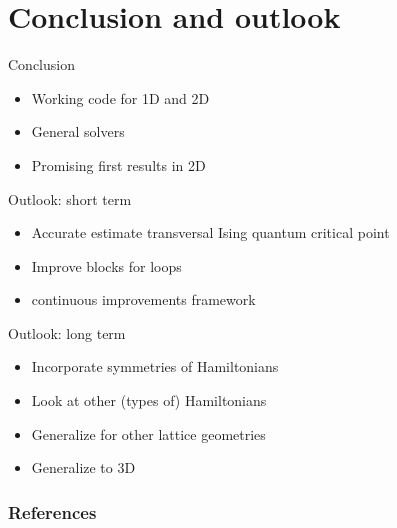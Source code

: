 \documentclass[aspectratio=169]{beamer}
\begin{document}

\section{Conclusion and outlook}
\begin{frame}{Conclusion}
    \begin{itemize}
        \item Working code for 1D and 2D
        \item General solvers
        \item Promising first results in 2D
    \end{itemize}
\end{frame}

\begin{frame}{Outlook: short term}
    \begin{itemize}
        \item Accurate estimate transversal Ising quantum critical point
        \item Improve blocks for loops
        \item continuous improvements framework
    \end{itemize}
\end{frame}

\begin{frame}{Outlook: long term}
    \begin{itemize}
        \item Incorporate symmetries of Hamiltonians
        \item Look at other (types of) Hamiltonians
        \item Generalize for other lattice geometries
        \item Generalize to 3D
    \end{itemize}
\end{frame}

\begin{frame}[allowframebreaks]
    \frametitle{References}
    
    
\end{frame}
\end{document}
